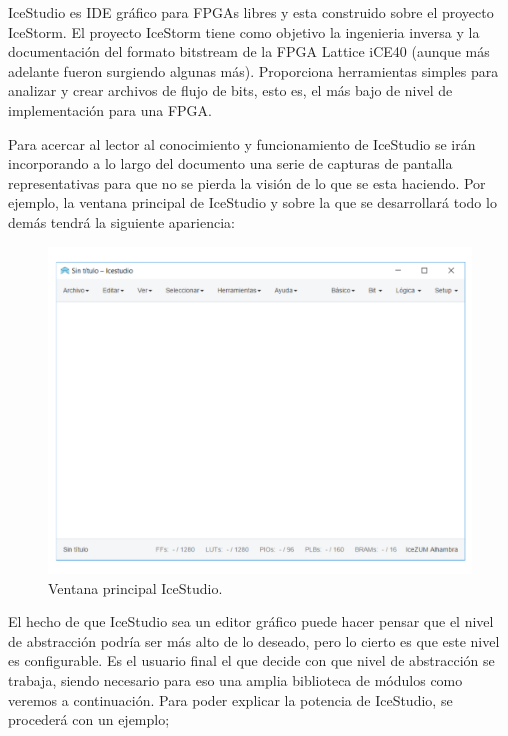 IceStudio es IDE gráfico para FPGAs libres y esta construido sobre el proyecto IceStorm. 
El proyecto IceStorm tiene como objetivo la ingenieria inversa y la documentación del formato bitstream de la FPGA Lattice iCE40 (aunque más adelante fueron surgiendo algunas más). Proporciona herramientas simples para analizar y crear archivos de flujo de bits, esto es, el más bajo de nivel de implementación para una FPGA.\newline

Para acercar al lector al conocimiento y funcionamiento de IceStudio se irán incorporando a lo largo del documento una serie de capturas de pantalla representativas para que no se pierda la visión de lo que se esta haciendo. Por ejemplo, la ventana principal de IceStudio y sobre la que se desarrollará todo lo demás tendrá la siguiente apariencia: \newline

\begin{figure}[H]
	\center
	\includegraphics[trim = 0mm 0mm 0mm 0mm, clip,scale=0.4]{imagenes/EstadoArte/Main_IceStudio.pdf}
	\caption{Ventana principal IceStudio.}
	\label{fig:Main_IceStudio}
\end{figure}

El hecho de que IceStudio sea un editor gráfico puede hacer pensar que el nivel de abstracción podría ser más alto de lo deseado, pero lo cierto es que este nivel es configurable. \newline
Es el usuario final el que decide con que nivel de abstracción se trabaja, siendo necesario para eso una amplia biblioteca de módulos como veremos a continuación. Para poder explicar la potencia de IceStudio, se procederá con un ejemplo;\newline

